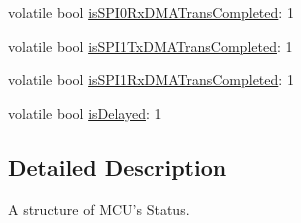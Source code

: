 \begin{DoxyCompactItemize}
\item 
volatile bool \hyperlink{struct_t_m_c_u_status_ae8571f5d7f20af8bfaa6cfdf05146599}{is\-S\-P\-I0\-Rx\-D\-M\-A\-Trans\-Completed}\-: 1
\item 
volatile bool \hyperlink{struct_t_m_c_u_status_ab160f18b2afdcd78e46b3c21c50c62ea}{is\-S\-P\-I1\-Tx\-D\-M\-A\-Trans\-Completed}\-: 1
\item 
volatile bool \hyperlink{struct_t_m_c_u_status_aa864edeb6786363beac08a6c3bac7903}{is\-S\-P\-I1\-Rx\-D\-M\-A\-Trans\-Completed}\-: 1
\item 
volatile bool \hyperlink{struct_t_m_c_u_status_ad8338db303c6d87f044bdc059deee376}{is\-Delayed}\-: 1
\end{DoxyCompactItemize}


\subsection{Detailed Description}
A structure of M\-C\-U's Status. 

